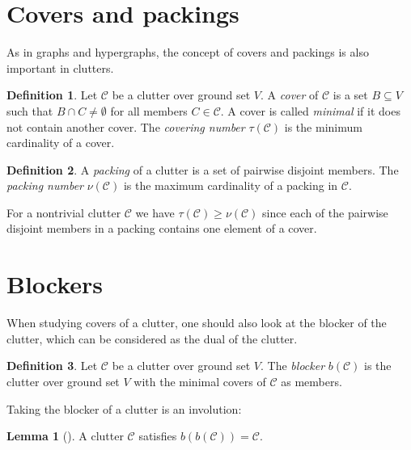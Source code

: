 \documentclass[a4paper, 12pt]{scrbook}
\theoremstyle{definition}
\newtheorem*{definition}{Definition}
\newtheorem{lemma}[theorem]{Lemma}
\begin{document}
\section{Covers and packings}
As in graphs and hypergraphs, the concept of covers and packings is also important in clutters.
\begin{definition}
    Let $\mathcal{C}$ be a clutter over ground set $V$.
    A \emph{cover} of $\mathcal{C}$ is a set $B \subseteq V$ such that $B \cap C \neq \emptyset$ for all members $C \in \mathcal{C}$.
    A cover is called \emph{minimal} if it does not contain another cover.
    The \emph{covering number} $\tau(\mathcal{C})$ is the minimum cardinality of a cover.
\end{definition}

\begin{definition}
    A \emph{packing} of a clutter is a set of pairwise disjoint members.
    The \emph{packing number} $\nu(\mathcal{C})$ is the maximum cardinality of a packing in $\mathcal{C}$.
\end{definition}

For a nontrivial clutter $\mathcal{C}$ we have $\tau(\mathcal{C}) \geq \nu(\mathcal{C})$ since each of the pairwise disjoint members in a packing contains one element of a cover.

\section{Blockers}
When studying covers of a clutter, one should also look at the blocker of the clutter, which can be considered as the dual of the clutter.
\begin{definition}
    Let $\mathcal{C}$ be a clutter over ground set $V$.
    The \emph{blocker} $b(\mathcal{C})$ is the clutter over ground set $V$ with the minimal covers of $\mathcal{C}$ as members.
\end{definition}

Taking the blocker of a clutter is an involution:

\begin{lemma}[\cite{blocker}]
    A clutter $\mathcal{C}$ satisfies $b(b(\mathcal{C}))=\mathcal{C}$.
\end{lemma}
\end{document}
